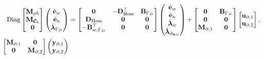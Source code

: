 \begin{equation}
\begin{aligned}
\mathrm{Diag}
\begin{bmatrix}
\mathbf{M}_{\rho h}\\
\mathbf{M}_{\bm{\mathcal{C}}_b}\\
\mathbf{0}\\
\end{bmatrix}
\begin{pmatrix}
\dot{\mathbf{e}}_{w} \\
\dot{\mathbf{e}}_{\kappa} \\
\dot{\bm{\lambda}}_{\Gamma_D} \\
\end{pmatrix}
&= \begin{bmatrix}
\mathbf{0} & - \mathbf{D}_{\operatorname*{Hess}}^\top & \mathbf{B}_{\Gamma_D}\\
\mathbf{D}_{\operatorname*{Hess}} & \mathbf{0} & \mathbf{0} \\
-\mathbf{B}_{w, \Gamma_D}^\top & \mathbf{0} & \mathbf{0} \\
\end{bmatrix} 
\begin{pmatrix}
\dot{\mathbf{e}}_{w} \\
\dot{\mathbf{e}}_{\kappa} \\
\dot{\bm{\lambda}}_{w} \\
\dot{\bm{\lambda}}_{\partial_{\bm{n} w}} \\
\end{pmatrix} + 
\begin{bmatrix}
\mathbf{0} & \mathbf{B}_{\Gamma_N} \\
\mathbf{0} & \mathbf{0} \\
\mathbf{M}_{\partial, 1} & \mathbf{0} \\
\end{bmatrix}
\begin{bmatrix}
\mathbf{u}_{\partial, 1} \\
\mathbf{u}_{\partial, 2} \\
\end{bmatrix}, \\
\begin{bmatrix}
\mathbf{M}_{\partial, 1} & \mathbf{0} \\
\mathbf{0} & \mathbf{M}_{\partial, 2} \\
\end{bmatrix}
\begin{pmatrix}
\mathbf{y}_{\partial, 1} \\
\mathbf{y}_{\partial, 2} \\

\end{pmatrix}
\end{aligned}
\end{equation}
